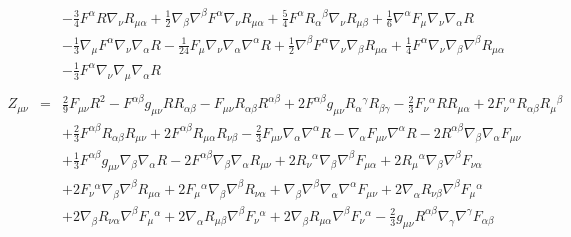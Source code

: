\documentclass[10pt,letterpaper]{article}
\numberwithin{equation}{section}
\begin{document}
\begin{eqnarray}
&& -  \tfrac{3}{4} F^{\alpha } R \nabla_{\nu }R_{\mu \alpha } + \tfrac{1}{2} \nabla_{\beta }\nabla^{\beta }F^{\alpha } \nabla_{\nu }R_{\mu \alpha } + \tfrac{5}{4} F^{\alpha } R_{\alpha }{}^{\beta } \nabla_{\nu }R_{\mu \beta } + \tfrac{1}{6} \nabla^{\alpha }F_{\mu } \nabla_{\nu }\nabla_{\alpha }R \nonumber \\ 
&& -  \tfrac{1}{3} \nabla_{\mu }F^{\alpha } \nabla_{\nu }\nabla_{\alpha }R -  \tfrac{1}{24} F_{\mu } \nabla_{\nu }\nabla_{\alpha }\nabla^{\alpha }R + \tfrac{1}{2} \nabla^{\beta }F^{\alpha } \nabla_{\nu }\nabla_{\beta }R_{\mu \alpha } + \tfrac{1}{4} F^{\alpha } \nabla_{\nu }\nabla_{\beta }\nabla^{\beta }R_{\mu \alpha } \nonumber \\ 
&& -  \tfrac{1}{3} F^{\alpha } \nabla_{\nu }\nabla_{\mu }\nabla_{\alpha }R
\\ \nonumber\\
Z_{\mu\nu}&=& \tfrac{2}{9} F_{\mu \nu } R^2 -  F^{\alpha \beta } g_{\mu \nu } R R_{\alpha \beta } -  F_{\mu \nu } R_{\alpha \beta } R^{\alpha \beta } + 2 F^{\alpha \beta } g_{\mu \nu } R_{\alpha }{}^{\gamma } R_{\beta \gamma } -  \tfrac{2}{3} F_{\nu }{}^{\alpha } R R_{\mu \alpha } + 2 F_{\nu }{}^{\alpha } R_{\alpha \beta } R_{\mu }{}^{\beta } \nonumber \\ 
&& + \tfrac{2}{3} F^{\alpha \beta } R_{\alpha \beta } R_{\mu \nu } + 2 F^{\alpha \beta } R_{\mu \alpha } R_{\nu \beta } -  \tfrac{2}{3} F_{\mu \nu } \nabla_{\alpha }\nabla^{\alpha }R -  \nabla_{\alpha }F_{\mu \nu } \nabla^{\alpha }R - 2 R^{\alpha \beta } \nabla_{\beta }\nabla_{\alpha }F_{\mu \nu } \nonumber \\ 
&& + \tfrac{1}{3} F^{\alpha \beta } g_{\mu \nu } \nabla_{\beta }\nabla_{\alpha }R - 2 F^{\alpha \beta } \nabla_{\beta }\nabla_{\alpha }R_{\mu \nu } + 2 R_{\nu }{}^{\alpha } \nabla_{\beta }\nabla^{\beta }F_{\mu \alpha } + 2 R_{\mu }{}^{\alpha } \nabla_{\beta }\nabla^{\beta }F_{\nu \alpha } \nonumber \\ 
&& + 2 F_{\nu }{}^{\alpha } \nabla_{\beta }\nabla^{\beta }R_{\mu \alpha } + 2 F_{\mu }{}^{\alpha } \nabla_{\beta }\nabla^{\beta }R_{\nu \alpha } + \nabla_{\beta }\nabla^{\beta }\nabla_{\alpha }\nabla^{\alpha }F_{\mu \nu } + 2 \nabla_{\alpha }R_{\nu \beta } \nabla^{\beta }F_{\mu }{}^{\alpha } \nonumber \\ 
&& + 2 \nabla_{\beta }R_{\nu \alpha } \nabla^{\beta }F_{\mu }{}^{\alpha } + 2 \nabla_{\alpha }R_{\mu \beta } \nabla^{\beta }F_{\nu }{}^{\alpha } + 2 \nabla_{\beta }R_{\mu \alpha } \nabla^{\beta }F_{\nu }{}^{\alpha } -  \tfrac{2}{3} g_{\mu \nu } R^{\alpha \beta } \nabla_{\gamma }\nabla^{\gamma }F_{\alpha \beta } \nonumber \\ 

\end{eqnarray}
\end{document}
